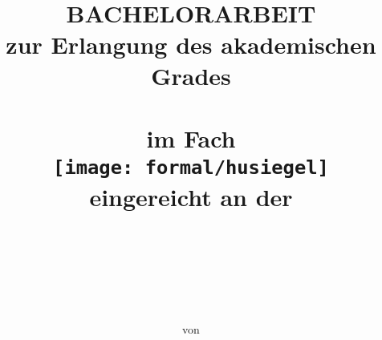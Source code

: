 

\author{von \\ \dcauthorpre\ \dcauthorname\ \dcauthorsurname\ \\ \dcauthoradd}

\title{ \vspace{-4cm}\dctitle \\ 
\vspace{0.5cm}
\large{\dcsubtitle} \\ 
\vspace{0.5cm} {\Large{BACHELORARBEIT}}\\ 
\vspace{0.5cm} \large{zur Erlangung des akademischen Grades \\ 
\dcdegree\\ im Fach \dcsubject \\\vspace{0.5cm}
\texttt{[image: formal/husiegel]}\\ 
\vspace{0.5cm} eingereicht an der \\ 
\dcfaculty \\ 
\dcinstitute\\
\dcuniversity \\}}
